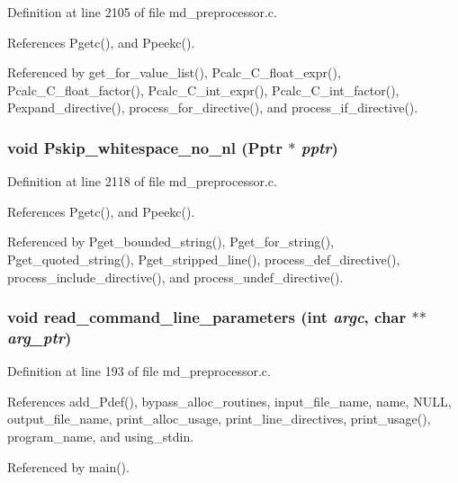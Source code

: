 Definition at line 2105 of file md\_\-preprocessor.c.

References Pgetc(), and Ppeekc().

Referenced by get\_\-for\_\-value\_\-list(), Pcalc\_\-C\_\-float\_\-expr(), Pcalc\_\-C\_\-float\_\-factor(), Pcalc\_\-C\_\-int\_\-expr(), Pcalc\_\-C\_\-int\_\-factor(), Pexpand\_\-directive(), process\_\-for\_\-directive(), and process\_\-if\_\-directive().
\subsubsection{\setlength{\rightskip}{0pt plus 5cm}void Pskip\_\-whitespace\_\-no\_\-nl (\bf{Pptr} $\ast$ {\em pptr})}\label{md__preprocessor_8c_f80ca7eae5033482494d22ef8ecdfbfb}




Definition at line 2118 of file md\_\-preprocessor.c.

References Pgetc(), and Ppeekc().

Referenced by Pget\_\-bounded\_\-string(), Pget\_\-for\_\-string(), Pget\_\-quoted\_\-string(), Pget\_\-stripped\_\-line(), process\_\-def\_\-directive(), process\_\-include\_\-directive(), and process\_\-undef\_\-directive().
\subsubsection{\setlength{\rightskip}{0pt plus 5cm}void read\_\-command\_\-line\_\-parameters (int {\em argc}, char $\ast$$\ast$ {\em arg\_\-ptr})}\label{md__preprocessor_8c_b5ad1e75f3e95a8372855846f911efe1}




Definition at line 193 of file md\_\-preprocessor.c.

References add\_\-Pdef(), bypass\_\-alloc\_\-routines, input\_\-file\_\-name, name, NULL, output\_\-file\_\-name, print\_\-alloc\_\-usage, print\_\-line\_\-directives, print\_\-usage(), program\_\-name, and using\_\-stdin.

Referenced by main().
